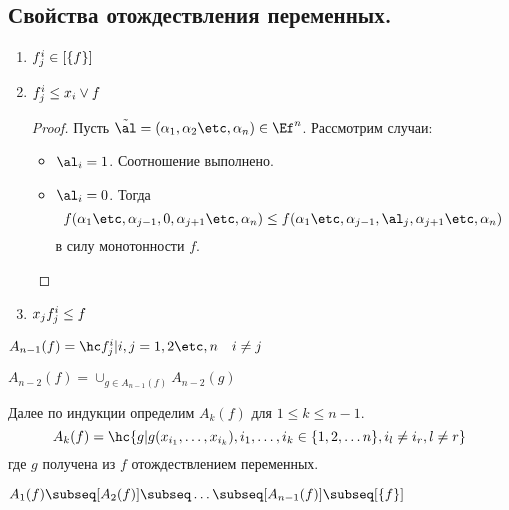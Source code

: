 \documentclass[unicode,10pt]{article}
\begin{document}
\subsection{Свойства отождествления переменных.}
\begin{enumerate}
  \item $f^i_j \in [\{f\}]$
  \item
    \begin{lemma}
      $f^i_j \le x_i\vee f$
    \end{lemma}
    \begin{proof}
      Пусть $\alt=(\set{n}) \in \Ef^n$. Рассмотрим случаи:
      \begin{itemize}
        \item $\al_i=1$. Соотношение выполнено.
        \item $\al_i=0$. Тогда \CHECK
          \begin{displaymath}
            f(\seti{1}{j-1},0,\seti{j+1}{n}) \le f(\seti{1}{j-1},\al_j,\seti{j+1}{n})
          \end{displaymath}
          в силу монотонности $f$.
      \end{itemize}
    \end{proof}
      \item
        \begin{lemma}
          \begin{math}
            x_jf^i_j \le f
          \end{math}
        \end{lemma}
\end{enumerate}
\begin{df}
  \begin{math}
    A_{n-1}(f) = \setof{\fij}{i,j=1,2\etc,n \quad i\ne j}
  \end{math}
\end{df}
\begin{df}
  \begin{math}
    A_{n-2}(f) = \cup_{g \in A_{n-1}(f)}A_{n-2}(g)
  \end{math}
\end{df}
\begin{df}
  Далее по индукции определим $A_k(f)$ для $1\le k\le n-1$.
  \begin{displaymath}
    A_k(f)=\hc{g | g(x_{i_1},\ldots,x_{i_k}), i_1,\ldots,i_k\in \{1,2,\ldots n\}, i_l\ne i_r, l\ne r }
  \end{displaymath}
где $g$ получена из $f$ отождествлением переменных.\\
\end{df}
\begin{stm}
  \begin{math}
    A_1(f) \subseq [A_2(f)] \subseq\ldots\subseq [A_{n-1}(f)]\subseq\cls{f}
  \end{math}
\end{stm}
\end{document}
